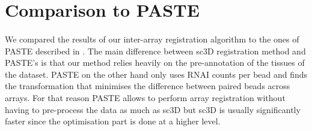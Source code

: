 \documentclass[10pt,a4paper]{article}
\begin{document}
\section{Comparison to PASTE}
\paragraph{}We compared the results of our inter-array registration algorithm to the ones of PASTE described in \cite{Zeira:2022}.
The main difference between sc3D registration method and PASTE's is that our method relies heavily on the pre-annotation of the tissues of the dataset.
PASTE on the other hand only uses RNAI counts per bead and finds the transformation that minimises the difference between paired beads across arrays.
For that reason PASTE allows to perform array registration without having to pre-process the data as much as sc3D but sc3D is usually significantly faster since the optimisation part is done at a higher level.
\end{document}
